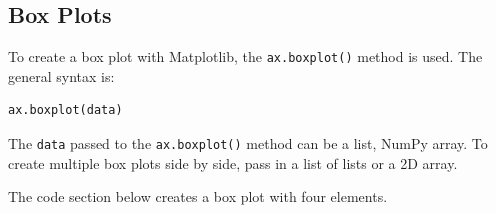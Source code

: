 \documentclass{book}
\begin{document}
    
        \subsection{Box Plots}\label{box-plots}
    




    
        To create a box plot with Matplotlib, the \lstinline!ax.boxplot()!
method is used. The general syntax is:

\begin{lstlisting}[language=Python]
ax.boxplot(data)
\end{lstlisting}

The \lstinline!data! passed to the \lstinline!ax.boxplot()! method can
be a list, NumPy array. To create multiple box plots side by side, pass
in a list of lists or a 2D array.

The code section below creates a box plot with four elements.
    
\end{document}
